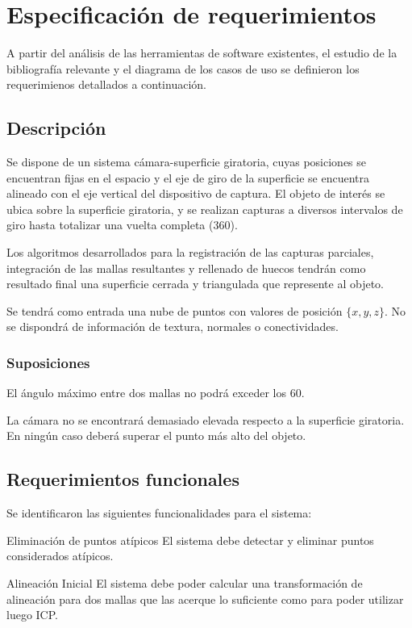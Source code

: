 \section{Especificación de requerimientos}
A partir del análisis de las herramientas de software existentes,
el estudio de la bibliografía relevante y el diagrama de los casos de uso
se definieron los requerimienos detallados a continuación.

\subsection{Descripción}
	Se dispone de un sistema cámara-superficie giratoria, cuyas posiciones
	se encuentran fijas en el espacio y el eje de giro de la superficie se
	encuentra alineado con el eje vertical del dispositivo de captura.
	El objeto de interés se ubica sobre la superficie giratoria, y se
	realizan capturas a diversos intervalos de giro
	hasta totalizar una vuelta completa (360\textdegree).

	Los algoritmos desarrollados para la registración de las capturas parciales,
	integración de las mallas resultantes y rellenado de huecos tendrán como resultado final
	una superficie cerrada y triangulada que represente al objeto.

	Se tendrá como entrada una nube de puntos con valores de posición $\{x, y, z\}$.
	No se dispondrá de información de textura, normales o conectividades.

	\subsubsection{Suposiciones}
		El ángulo máximo entre dos mallas no podrá exceder los 60\textdegree.

		La cámara no se encontrará demasiado elevada respecto a la
		superficie giratoria. En ningún caso deberá superar el punto más alto del objeto.

\subsection{Requerimientos funcionales}
Se identificaron las siguientes funcionalidades para el sistema:

	\Requerimiento
		{Eliminación de puntos atípicos}
		{El sistema debe detectar y eliminar puntos considerados atípicos.}

	\Requerimiento
		{Alineación Inicial}
		{El sistema debe poder calcular una transformación de alineación para dos mallas
		que las acerque lo suficiente como para poder utilizar luego ICP.}

